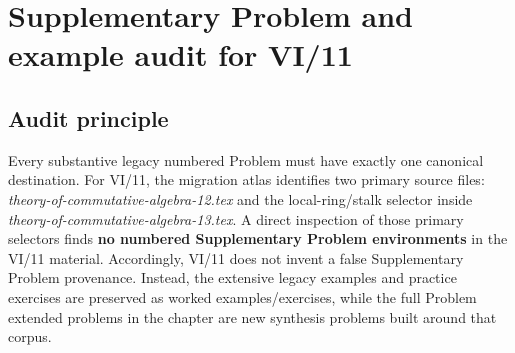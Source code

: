 \chapter{Supplementary Problem and example audit for VI/11}
\label{app:legacy-audit-vi11}

\section*{Audit principle}
Every substantive legacy numbered Problem must have exactly one canonical destination.  For
VI/11, the migration atlas identifies two primary source files:
\emph{theory-of-commutative-algebra-12.tex} and the local-ring/stalk selector inside
\emph{theory-of-commutative-algebra-13.tex}.  A direct inspection of those primary selectors
finds \textbf{no numbered Supplementary Problem environments} in the VI/11 material.  Accordingly,
VI/11 does not invent a false Supplementary Problem provenance.  Instead, the extensive legacy
examples and practice exercises are preserved as worked examples/exercises, while the full
Problem extended problems in the chapter are new synthesis problems built around that corpus.

